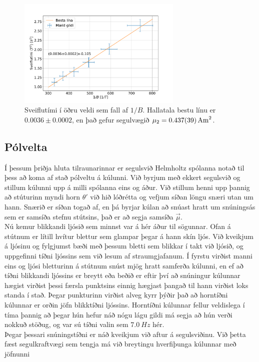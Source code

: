 \documentclass[11pt]{article}
\begin{document}
\begin{figure}[H]
    \centering
    \includegraphics[width=0.7\textwidth]{Hluti_2.PDF}
    \caption{Sveiflutími í öðru veldi sem fall af $1/B$. Hallatala bestu línu er $0.0036 \pm 0.0002$, en það gefur segulvægið $\mu_2 = \SI{0.437 \pm 0.039}{A m^2}$.}
    \label{fig:hluti 2}
\end{figure}

\subsection{Pólvelta}
Í þessum þriðja hluta tilraunarinnar er segulsvið Helmholtz spólanna notað til þess að koma af stað pólveltu á kúlunni. Við byrjum með ekkert segulsvið og stillum kúlunni upp á milli spólanna eins og áður. Við stillum henni upp þannig að stúturinn myndi horn $\theta '$ við hið lóðrétta og vefjum síðan löngu snæri utan um hann. Snærið er síðan togað af, en þá byrjar kúlan að snúast hratt um snúningsás sem er samsíða stefnu stútsins, það er að segja samsíða $\Vec{\mu}$. \\
Nú kemur blikkandi ljósið sem minnst var á hér áður til sögunnar. Ofan á stútnum er lítill hvítur blettur sem glampar þegar á hann skín ljós. Við kveikjum á ljósinu og fylgjumst bæði með þessum bletti sem blikkar í takt við ljósið, og uppgefinni tíðni ljóssins sem við lesum af straumgjafanum. Í fyrstu virðist manni eins og ljósi bletturinn á stútnum snúst mjög hratt samferða kúlunni, en ef að tíðni blikkandi ljóssins er breytt eða beðið er eftir því að snúningur kúlunnar hægist virðist þessi færsla punktsins einnig hægjast þangað til hann virðist loks standa í stað. Þegar punkturinn virðist alveg kyrr þýðir það að horntíðni kúlunnar er orðin jöfn blikktíðni ljóssins. Horntíðni kúlunnar fellur veldislega í tíma þannig að þegar hún hefur náð nógu lágu gildi má segja að hún verði nokkuð stöðug, og var sú tíðni valin sem $\SI{7.0}{Hz}$ hér. \\
Þegar þessari snúningstíðni er náð kveikjum við aftur á segulsviðinu. Við þetta fæst segulkraftvægi sem tengja má við breytingu hverfiþunga kúlunnar með jöfnunni
\end{document}
